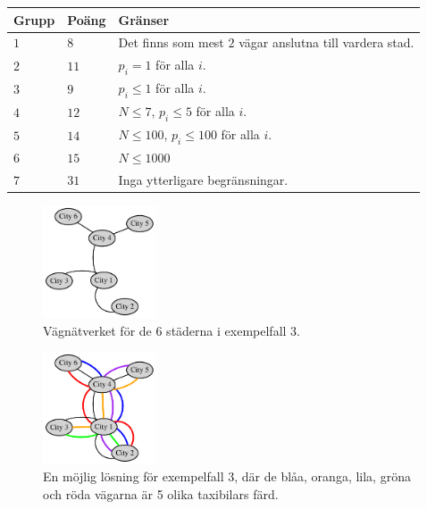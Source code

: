 \noindent
\begin{tabular}{| l | l | p{12cm} |}
  \hline
  \textbf{Grupp} & \textbf{Poäng} & \textbf{Gränser} \\ \hline
  $1$    & $8$        & Det finns som mest $2$ vägar anslutna till vardera stad. \\ \hline
  $2$    & $11$       & $p_i = 1$ för alla $i$. \\ \hline
  $3$    & $9$        & $p_i \le 1$ för alla $i$. \\ \hline
  $4$    & $12$       & $N \le 7$, $p_i \le 5$ för alla $i$. \\ \hline
  $5$    & $14$       & $N \le 100$, $p_i \le 100$ för alla $i$. \\ \hline
  $6$    & $15$       & $N \le 1000$ \\ \hline
  $7$    & $31$       & Inga ytterligare begränsningar. \\ \hline
\end{tabular}


\begin{figure}[h!]
  \centering
  \includegraphics[width=0.3\textwidth]{dalarna_sample3.pdf}
  \caption{Vägnätverket för de 6 städerna i exempelfall 3.}
  \label{fig:dalarna_sample3}
\end{figure}

\begin{figure}[h!]
  \centering
  \includegraphics[width=0.3\textwidth]{dalarna_sample3b.pdf}
  \caption{En möjlig lösning för exempelfall 3, där de blåa, oranga, lila, gröna och röda vägarna är 5 olika taxibilars färd.}
  \label{fig:dalarna_sample3b}
\end{figure}